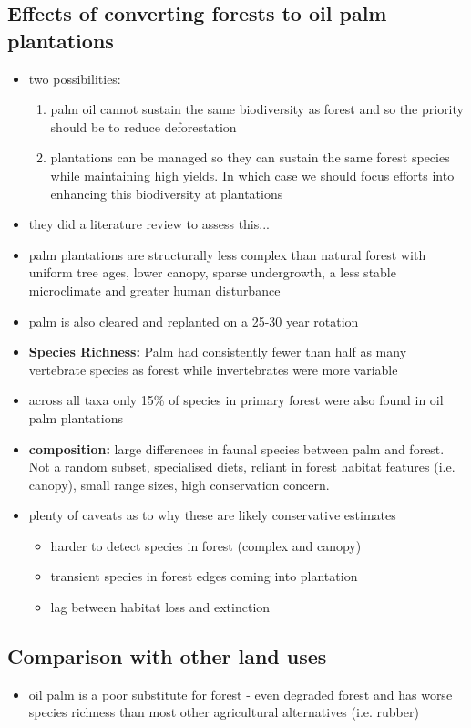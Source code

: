 \subsection*{Effects of converting forests to oil palm plantations}
\begin{itemize}
	\item two possibilities:
	\begin{enumerate}
		\item palm oil cannot sustain the same biodiversity as forest and so the priority should be to reduce deforestation
		\item plantations can be managed so they can sustain the same forest species while maintaining high yields. In which case we should focus efforts into enhancing this biodiversity at plantations
	\end{enumerate}
	\item they did a literature review to assess this...
	\item palm plantations are structurally less complex than natural forest with uniform tree ages, lower canopy, sparse undergrowth, a less stable microclimate and greater human disturbance
	\item palm is also cleared and replanted on a 25-30 year rotation
	\item \textbf{Species Richness:} Palm had consistently fewer than half as many vertebrate species as forest while invertebrates were more variable
	\item across all taxa only 15\% of species in primary forest were also found in oil palm plantations
	\item \textbf{composition:} large differences in faunal species between palm and forest. Not a random subset, specialised diets, reliant in forest habitat features (i.e. canopy), small range sizes, high conservation concern.
	\item plenty of caveats as to why these are likely conservative estimates
	\begin{itemize}
		\item harder to detect species in forest (complex and canopy)
		\item transient species in forest edges coming into plantation
		\item lag between habitat loss and extinction
	\end{itemize}
\end{itemize}


\subsection*{Comparison with other land uses}
\begin{itemize}
	\item oil palm is a poor substitute for forest - even degraded forest and has worse species richness than most other agricultural alternatives (i.e. rubber)
\end{itemize}


